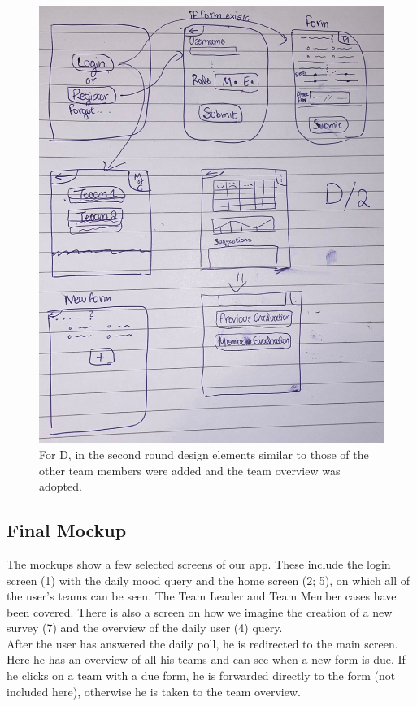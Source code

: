 \documentclass[11pt]{article}
\begin{document}
\begin{figure}[!h]
    \centering
    \includegraphics[width = \textwidth]{figures/D2.jpg}
    \caption{For D, in the second round design elements similar to those of the other team members were added and the team overview was adopted.}
\end{figure}

\clearpage


\subsection{Final Mockup}
The mockups show a few selected screens of our app. These include the login screen (1) with the daily mood query and the home screen (2; 5), on which all of the user's teams can be seen. The Team Leader and Team Member cases have been covered. There is also a screen on how we imagine the creation of a new survey (7) and the overview of the daily user (4) query.\\
After the user has answered the daily poll, he is redirected to the main screen. Here he has an overview of all his teams and can see when a new form is due. If he clicks on a team with a due form, he is forwarded directly to the form (not included here), otherwise he is taken to the team overview. 
\end{document}
